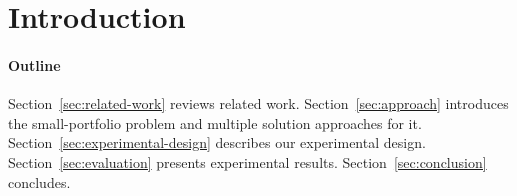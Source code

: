 \section{Introduction}
\label{sec:introduction}

\paragraph{Outline}

Section~\ref{sec:related-work} reviews related work.
Section~\ref{sec:approach} introduces the small-portfolio problem and multiple solution approaches for it.
Section~\ref{sec:experimental-design} describes our experimental design.
Section~\ref{sec:evaluation} presents experimental results.
Section~\ref{sec:conclusion} concludes.
